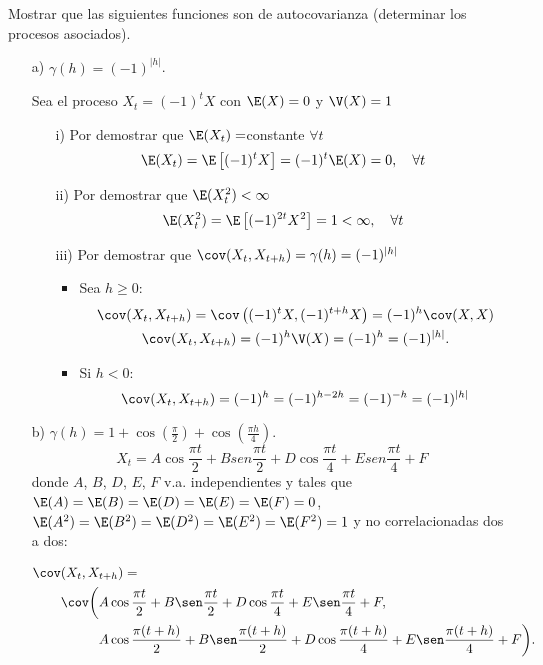 \begin{ejemplo} Mostrar que las siguientes funciones son de autocovarianza (determinar los procesos asociados).

\begin{enumerate}
\item[a)] $\gamma (h)=(-1)^{\left| h \right|}$.

Sea el proceso $X_{t} =(-1)^{t}X$ con $\E(X)=0$ y $\V(X)=1$
 
\begin{enumerate}
      \item[i)] Por demostrar que $\E(X_{t} )=$constante $\forall t$
	\[
		\E(X_{t} )=\E\left[ {(-1)^{t}X} \right]=(-1)^{t}\E(X)=0,\quad\forall t
	\]
	\item[ii)] Por demostrar que $\E(X_{t}^{2} )<\infty $
	\[
		\E(X_{t}^{2} )=\E\left[ {(-1)^{2t}X^{2}} \right]=1<\infty,\quad\forall t
	\]
	\item[iii)] Por demostrar que $\cov (X_{t} ,X_{t+h} )=\gamma (h)=(-1)^{\left| h \right|}$
		\begin{itemize}
		\item Sea $h\geq 0$:
		\begin{gather*}
			 \cov(X_{t} ,X_{t+h} )=\cov\left((-1)^{t}X,(-1)^{t+h}X\right)=(-1)^{h}\cov(X,X)\\
			 \cov(X_{t} ,X_{t+h} )=(-1)^{h}\V(X)=(-1)^{h}=(-1)^{\left| h \right|}.
		\end{gather*}

		\item Si $h< 0$:
		\[
		 \cov(X_{t} ,X_{t+h} )=(-1)^{h}=(-1)^{h-2h}=(-1)^{-h}=(-1)^{\left| h\right|}
		\]
		\end{itemize}
	\end{enumerate}

\item[b)] $\gamma (h)=1+\cos \left( {\frac{\pi }{2}} \right)+\cos \left({\frac{\pi h}{4}} \right)$.
\[
	X_{t} =A\cos \frac{\pi t}{2}+Bsen\frac{\pi t}{2}+D\cos \frac{\pi t}{4}+Esen\frac{\pi t}{4}+F
\]
donde $A$, $B$, $D$, $E$, $F$ v.a. independientes y tales que $\E(A)= \E(B)= \E(D)= \E(E)= \E(F)=0$, $\E(A^{2})= \E(B^{2})= \E(D^{2})= \E(E^{2})= \E(F^{2})=1$ y no correlacionadas dos a dos:

\begin{align*}
\cov&(X_{t} ,X_{t+h} )	=\\
	 &\cov\bigg( A\cos \frac{\pi t}{2}+B\sen\frac{\pi t}{2}+D\cos 	\frac{\pi t}{4}+E\sen\frac{\pi t}{4}+F, \\
	&\phantom{\cov\bigg(} A\cos \frac{\pi (t+h)}{2}+B\sen\frac{\pi (t+h)}{2}+D\cos \frac{\pi (t+h)}{4}+E\sen\frac{\pi (t+h)}{4}+F\bigg).
\end{align*}


\end{enumerate}
\end{ejemplo}
